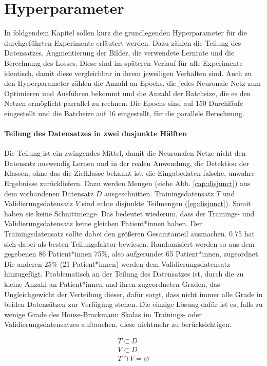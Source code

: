 \section{Hyperparameter}\label{hyper}
In foldgendem Kapitel sollen kurz die grundlegenden Hyperparameter für die durchgeführten Experimente erläutert werden. Dazu zählen die Teilung des Datensatzes, Augmentierung der Bilder, die verwendete Lernrate und die Berechnung des Losses. Diese sind im späteren Verlauf für alle Experimente identisch, damit diese vergleichbar in ihrem jeweiligen Verhalten sind. Auch zu den Hyperparameter zählen die Anzahl an Epochs, die jedes Neuronale Netz zum Optimieren und Ausführen bekommt und die Anzahl der Batchsize, die es den Netzen ermöglicht parrallel zu rechnen. Die Epochs sind auf 150 Durchläufe eingestellt und die Batchsize auf 16 eingestellt, für die parallele Berechnung.

\paragraph{Teilung des Datensatzes in zwei dusjunkte Hälften} Die Teilung ist ein zwingendes Mittel, damit die Neuronalen Netze nicht den Datensatz auswendig Lernen und in der realen Anwendung, die Detektion der Klassen, ohne das die Zielklasse bekannt ist, die Eingabedaten falsche, unwahre Ergebnisse zurückliefern. Dazu werden Mengen (siehe Abb. \ref{cap:disjunct}) aus dem vorhandenen Datensatz $D$ ausgeschnitten. Trainingsdatensatz $T$ und Validierungsdatensatz $V$ sind echte disjunkte Teilmengen (\ref{eg:disjunct}). Somit haben sie keine Schnittmenge. Das bedeutet wiederum, dass der Trainings- und Validierungsdatensatz keine gleichen Patient*innen haben. Der Trainingsdatensatz sollte dabei den größeren Gesamtanteil ausmachen. 0.75 hat sich  dabei als besten Teilungsfaktor bewiesen. Randomisiert werden so aus dem gegebenen 86 Patient*innen 75\%, also aufgerundet 65 Patient*innen, zugeordnet. Die anderen 25\% (21 Patient*innen) werden dem Validierungsdatensatz hinzugefügt. Problematisch an der Teilung des Datensatzes ist, durch die zu kleine Anzahl an Patient*innen und ihren zugeordneten Graden, das Ungleichgewicht der Verteilung dieser, dafür sorgt, dass nicht immer alle Grade in beiden Datensätzen zur Verfügung stehen. Die einzige Lösung dafür ist es, falls zu wenige Grade des House-Brackmann Skalas im Trainings- oder Validierungsdatensatzes auftauchen, diese nichtmehr zu berücksichtigen.

\begin{equation}
\begin{split}
  T \subset D \\
  V \subset D \\
  T \cap V  = \varnothing
\end{split}
\label{eg:disjunct}
\end{equation}


